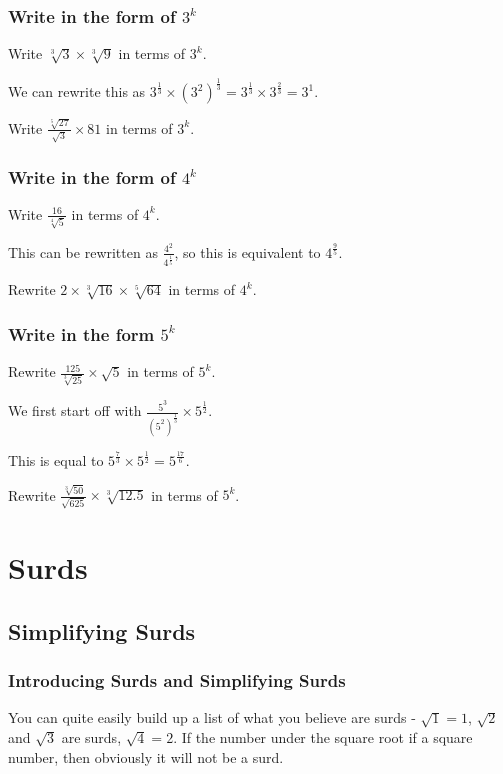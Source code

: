 \documentclass[../maths.tex]{subfiles}
\begin{document}
\subsubsection*{Write in the form of $3^k$}
\smallbreak
\begin{example}
    Write $\sqrt[3]{3} \times \sqrt[3]{9}$ in terms of $3^k$.

    We can rewrite this as $3^{\frac{1}{3}} \times (3^2)^{\frac{1}{3}} = 3^{\frac{1}{3}}\times 3^{\frac{2}{3}} = 3^1$.
\end{example}

\ex Write $\frac{\sqrt[5]{27}}{\sqrt{3}}\times 81$ in terms of $3^k$.

\subsubsection*{Write in the form of $4^k$}
\smallbreak
\begin{example}
    Write $\frac{16}{\sqrt[4]{5}}$ in terms of $4^k$.

    This can be rewritten as $\frac{4^2}{4^{\frac{1}{5}}}$, so this is equivalent to $4^{\frac{9}{5}}$.
\end{example}
\ex Rewrite $2\times \sqrt[3]{16} \times \sqrt[5]{64}$ in terms of $4^k$.

\subsubsection*{Write in the form $5^k$}
\smallbreak
\begin{example}
    Rewrite $\frac{125}{\sqrt[3]{25}}\times \sqrt{5}$ in terms of $5^k$.

    We first start off with $\frac{5^3}{(5^2)^{\frac{1}{3}}}\times 5^{\frac{1}{2}}$. 

    This is equal to $5^{\frac{7}{3}}\times 5^{\frac{1}{2}} = 5^{\frac{17}{6}}$.
\end{example}
\ex Rewrite $\frac{\sqrt[3]{50}}{\sqrt{625}}\times \sqrt[3]{12.5}$ in terms of $5^k$.

\section{Surds}
\subsection*{Simplifying Surds}
\subsubsection*{Introducing Surds and Simplifying Surds}
You can quite easily build up a list of what you believe are surds - $\sqrt{1}=1$, $\sqrt{2}$ and $\sqrt{3}$ are surds, $\sqrt{4}=2$.
If the number under the square root if a square number, then obviously it will not be a surd.
\end{document}
